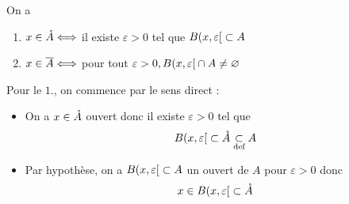 \documentclass[french,a4paper,10pt]{article}
\begin{document}
	\begin{proposition}
		On a
		\begin{enumerate}
			\item $x\in\mathring{A} \Longleftrightarrow$ il existe $\varepsilon>0$ tel que $B({x, \varepsilon}\mathopen{}[\mathclose{}\subset A$
			
			\item $x\in\overline{A}\Longleftrightarrow$ pour tout $\varepsilon>0, B({x,\varepsilon}\mathopen{}[\mathclose{}\cap A\ne \varnothing$
		\end{enumerate}
	\end{proposition}
	\begin{myproof}
		Pour le $1.$, on commence par le sens direct :
		\begin{itemize}[$\Longrightarrow$]
			\item On a $x\in \mathring{A}$ ouvert donc il existe $\varepsilon>0$ tel que
			\[\begin{aligned}
				B({x,\varepsilon}\mathopen{}[\mathclose{}\subset\mathring{A}\underset{\text{def}}{\subset} A
			\end{aligned}\]
		\end{itemize}
		\begin{itemize}[$\Longleftarrow$]
			\item Par hypothèse, on a $B({x, \varepsilon}\mathopen{}[\mathclose{}\subset A$ un ouvert de $A$ pour $\varepsilon>0$ donc 
			\[\begin{aligned}
				x\in B({x, \varepsilon}\mathopen{}[\mathclose{}\subset\mathring{A}
			\end{aligned}\]
		\end{itemize}
		

\end{myproof}
\end{document}
